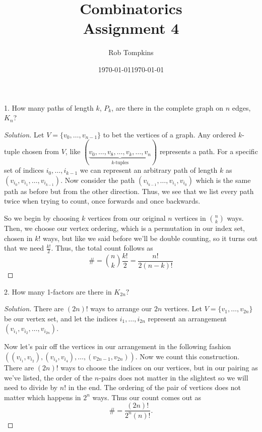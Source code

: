 \documentclass[12pt]{amsart}
\title{Combinatorics\\Assignment 4}
\author{Rob Tompkins}
\date{\today}
\newenvironment{solution}
{\begin{proof}[Solution]}
{\end{proof}}
\begin{document}
    \maketitle
    \date{\today}
    \begin{onehalfspace}
        1. How many paths of length $k$, $P_k$, are there in the complete graph on $n$
        edges, $K_n$?

        \begin{solution}
            Let $V=\{v_0,\ldots,v_{n-1}\}$ to bet the vertices of a graph.
            Any ordered $k$-tuple chosen from $V$, like $(\underbrace{v_0,\ldots,v_8,\ldots,v_k, \ldots, v_n}_{k\text{-tuples}})$ represents
            a path.
            For a specific set of indices $i_0,\ldots,i_{k-1}$ we can represent an arbitrary path of length $k$ as
            $(v_{i_0},v_{i_1},\ldots,v_{i_{k-1}})$. Now consider the path $(v_{i_{k-1}}, \ldots, v_{i_1}, v_{i_0})$
            which is the same path as before but from the other direction.
            Thus, we see that we list every path twice when trying to count, once forwards and once backwards.

            So we begin by choosing $k$ vertices from our original $n$ vertices in $\binom{n}{k}$ ways.
            Then, we choose our vertex ordering, which is a permutation in our index set, chosen in $k!$ ways,
            but like we said before we'll be double counting, so it turns out that we need $\frac{k!}{2}$.
            Thus, the total count follows as
            \begin{displaymath}
                \# = \binom{n}{k}\frac{k!}{2} = \frac{n!}{2(n-k)!}
            \end{displaymath}
        \end{solution}

        2. How many 1-factors are there in $K_{2n}?$

        \begin{solution}
            There are $(2n)!$ ways to arrange our $2n$ vertices.
            Let $V=\{v_1,\ldots , v_{2n}\}$ be our vertex set, and let
            the indices $i_1,\ldots, i_{2n}$ represent an arrangement
            $(v_{i_1},v_{i_2}, \ldots,v_{i_{2n}})$.

            Now let's pair off the vertices in our arrangement in the following fashion
            $((v_{i_1},v_{i_2}),(v_{i_3},v_{i_4}),\ldots,(v_{2n-1},v_{2n}))$.
            Now we count this construction. There are $(2n)!$ ways to choose the indices on
            our vertices, but in our pairing as we've listed, the order of the $n$-pairs does not matter
            in the slightest so we will need to divide by $n!$ in the end.
            The ordering of the pair of vertices does not matter which happens in $2^n$ ways. Thus
            our count comes out as
            \begin{displaymath}
                \# = \frac{(2n)!}{2^n(n)!}.
            \end{displaymath}
        \end{solution}


\end{onehalfspace}
\end{document}
